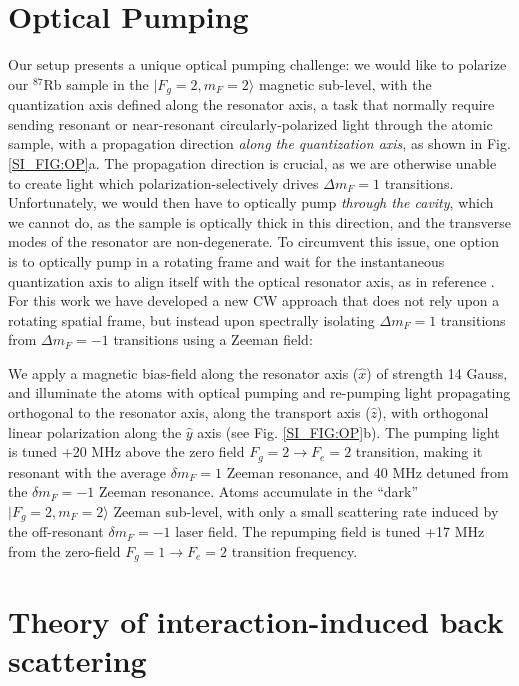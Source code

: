 \documentclass[aps,pra,twocolumn,groupedaddress,10pt,showpacs]{revtex4-1}
\begin{document}
\section{Optical Pumping}
\label{App:OptiPump}
Our setup presents a unique optical pumping challenge: we would like to polarize our $^{87}$Rb sample in the $|F_g=2,m_F=2\rangle$ magnetic sub-level, with the quantization axis defined along the resonator axis, a task that normally require sending resonant or near-resonant circularly-polarized light through the atomic sample, with a propagation direction \emph{along the quantization axis}, as shown in Fig. \ref{SI_FIG:OP}a. The propagation direction is crucial, as we are otherwise unable to create light which polarization-selectively drives $\Delta m_F=1$ transitions. Unfortunately, we would then have to optically pump \emph{through the cavity}, which we cannot do, as the sample is optically thick in this direction, and the transverse modes of the resonator are non-degenerate. To circumvent this issue, one option is to optically pump in a rotating frame and wait for the instantaneous quantization axis to align itself with the optical resonator axis, as in reference \cite{tanji2009heralded}. For this work we have developed a new CW approach that does not rely upon a rotating spatial frame, but instead upon spectrally isolating $\Delta m_F=1$ transitions from $\Delta m_F=-1$ transitions using a Zeeman field:

We apply a magnetic bias-field along the resonator axis ($\hat{x}$) of strength 14 Gauss, and illuminate the atoms with optical pumping and re-pumping light propagating orthogonal to the resonator axis, along the transport axis ($\hat{z}$), with orthogonal linear polarization along the $\hat{y}$ axis (see Fig. \ref{SI_FIG:OP}b). The pumping light is tuned +20 MHz above the zero field $F_g=2\rightarrow F_e=2$ transition, making it resonant with the average $\delta m_F=1$ Zeeman resonance, and 40 MHz detuned from the $\delta m_F=-1$ Zeeman resonance. Atoms accumulate in the ``dark'' $|F_g=2,m_F=2\rangle$ Zeeman sub-level, with only a small scattering rate induced by the off-resonant $\delta m_F=-1$ laser field. The repumping field is tuned +17 MHz from the zero-field $F_g=1\rightarrow F_e=2$ transition frequency. 

\section{Theory of interaction-induced back scattering}
\label{App:EITBackScattering}
\end{document}
